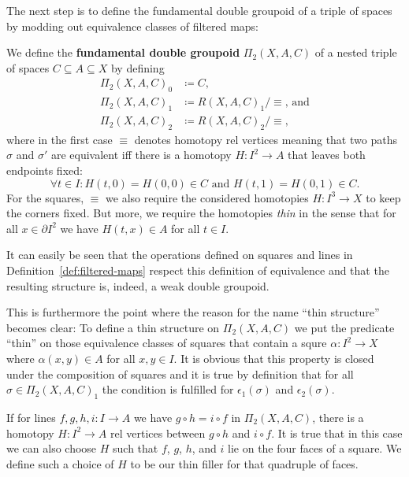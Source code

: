 The next step is to define the fundamental double groupoid of a triple of
spaces by modding out equivalence classes of filtered maps:

\begin{defn}
We define the \textbf{fundamental double groupoid} $\Pi_2(X, A, C)$ of a nested
triple of spaces $C \subseteq A \subseteq X$ by defining
\begin{align*}
\Pi_2(X, A, C)_0 &\coloneqq C \text{,}\\
\Pi_2(X, A, C)_1 &\coloneqq R(X,A,C)_1 / \equiv \text{, and} \\
\Pi_2(X, A, C)_2 &\coloneqq R(X,A,C)_2 / \equiv \text{,}
\end{align*}
where in the first case $\equiv$ denotes homotopy rel vertices meaning that two
paths $\sigma$ and $\sigma'$ are equivalent iff there is a homotopy
$H : I^2 \to A$ that leaves both endpoints fixed:
\begin{equation*}
\forall t \in I : H(t,0) = H(0,0) \in C \text{ and } H(t,1) = H(0,1) \in C \text{.}
\end{equation*}
For the squares, $\equiv$ we also require the considered homotopies 
$H : I^3 \to X$ to keep the corners fixed.
But more, we require the homotopies \emph{thin} in the sense that for all
$x \in \partial I^2$ we have $H(t,x) \in A$ for all $t \in I$.

It can easily be seen that the operations defined on squares and lines in
Definition~\ref{def:filtered-maps} respect this definition of equivalence and that
the resulting structure is, indeed, a weak double groupoid.

This is furthermore the point where the reason for the name ``thin structure'' becomes
clear:
To define a thin structure on $\Pi_2(X, A, C)$ we put the predicate ``thin''
on those equivalence classes of squares that contain a squre $\alpha : I^2 \to X$
where $\alpha(x, y) \in A$ for all $x, y \in I$.
It is obvious that this property is closed under the composition of squares and
it is true by definition that for all $\sigma \in \Pi_2(X, A, C)_1$ the condition
is fulfilled for $\epsilon_1(\sigma)$ and $\epsilon_2(\sigma)$.

If for lines $f, g, h, i : I \to A$ we have $g \circ h = i \circ f$ in
$\Pi_2(X, A, C)$, there is a homotopy $H : I^2 \to A$ rel vertices between
$g \circ h$ and $i \circ f$.
It is true that in this case we can also choose $H$ such that $f$, $g$, $h$, and
$i$ lie on the four faces of a square.
We define such a choice of $H$ to be our thin filler for that quadruple of faces.


\end{defn}
